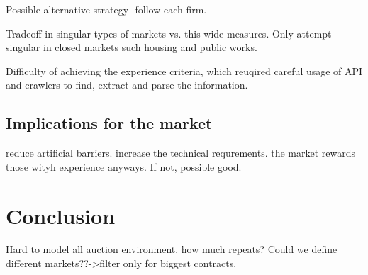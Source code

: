 Possible alternative strategy- follow each firm.

Tradeoff in singular types of markets vs. this wide measures. Only attempt singular in closed markets such housing and public works.

Difficulty of achieving the experience criteria, which reuqired careful usage of API and crawlers to find, extract and parse the information.

\section{Implications for the market}
reduce artificial barriers.
increase the technical requrements.
the market rewards those wityh experience anyways. If not, possible good.

\chapter{Conclusion}
Hard to model all auction environment. how much repeats?
Could we define different markets??->filter only for biggest contracts.
